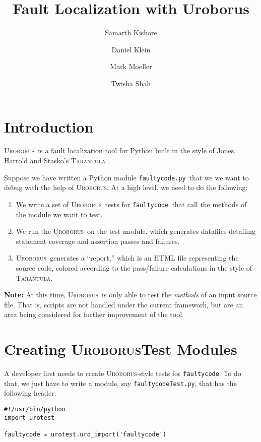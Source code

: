 \documentclass[english]{article}
\title{Fault Localization with Uroborus}
\author{Samarth Kishore
\and 
Daniel Klein
\and 
Mark Moeller
\and 
Twisha Shah
}
\newcommand{\Uro}{\textsc{Uroborus}}
\newcommand{\Taran}{\textsc{Tarantula}}
\newcommand{\fc}{\texttt{faultycode}}
\newcommand{\fcp}{\texttt{faultycode.py}}
\newcommand{\fcT}{\texttt{faultycodeTest.py}}
\newcommand{\fcip}{\texttt{faultycode\_instrumented.py}}
\begin{document}
\maketitle


\section{Introduction}

\Uro\ is a fault localization tool for Python built in the style of Jones, Harrold and Stasko's
\Taran ~\cite{Jones}.

Suppose we have written a Python module \fcp\ that we we want to debug with the
help of \Uro. At a high level, we need to do the following:
\begin{enumerate}
\item We write a set of \Uro\ tests for \fc\ that call the methods of the module we want to test.
\item We run the \Uro\ on the test module, which generates datafiles detailing statement coverage and assertion
passes and failures.
\item \Uro\ generates a ``report,'' which is an HTML file representing the source code, colored according
to the pass/failure calculations in the style of \Taran.
\end{enumerate}
\textbf{Note:} At this time, \Uro\ is only able to test the \emph{methods} of an
input source file. That is, scripts are not handled under the current framework, but are an area being
considered for further improvement of the tool.





\section{Creating \Uro Test Modules}

A developer first needs to create \Uro-style tests for \fc. To do that, we just have to write a
module, say \fcT, that has the following header:\\
\begin{verbatim}
#!/usr/bin/python
import urotest

faultycode = urotest.uro_import('faultycode')
\end{verbatim}
\end{document}

